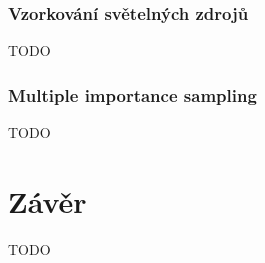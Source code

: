 \documentclass[czech,master]{diploma}
\begin{document}
\subsection{Vzorkování světelných zdrojů}
TODO

\subsection{Multiple importance sampling}
TODO


\chapter{Závěr}
TODO

\printbibliography[title={Literatura}, heading=bibintoc]

\appendix
\end{document}
